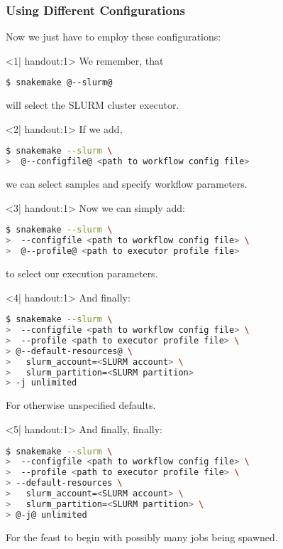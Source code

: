 \begin{frame}[fragile]
  \frametitle{Using Different Configurations}
  Now we just have to employ these configurations:\newline
  \begin{onlyenv}<1| handout:1>
    We remember, that 
    \begin{lstlisting}[language=Bash, style=Shell]
$ snakemake @--slurm@
    \end{lstlisting}
    will select the SLURM cluster executor.\vfill
  \end{onlyenv}
  \begin{onlyenv}<2| handout:1>
    If we add,
    \begin{lstlisting}[language=Bash, style=Shell]
$ snakemake --slurm \
>  @--configfile@ <path to workflow config file>
    \end{lstlisting}
    we can select samples and specify workflow parameters.\vfill
  \end{onlyenv}
  \begin{onlyenv}<3| handout:1>
   Now we can simply add:
       \begin{lstlisting}[language=Bash, style=Shell]
$ snakemake --slurm \
>  --configfile <path to workflow config file> \
>  @--profile@ <path to executor profile file> 
    \end{lstlisting}
    to select our execution parameters.\vfill
  \end{onlyenv}
  \begin{onlyenv}<4| handout:1>
   And finally:
       \begin{lstlisting}[language=Bash, style=Shell]
$ snakemake --slurm \
>  --configfile <path to workflow config file> \
>  --profile <path to executor profile file> \
> @--default-resources@ \ 
>   slurm_account=<SLURM account> \
>   slurm_partition=<SLURM partition> 
> -j unlimited
    \end{lstlisting}
    For otherwise unspecified defaults.
    \vfill
  \end{onlyenv}
  \begin{onlyenv}<5| handout:1>
   And finally, finally:
       \begin{lstlisting}[language=Bash, style=Shell]
$ snakemake --slurm \
>  --configfile <path to workflow config file> \
>  --profile <path to executor profile file> \
> --default-resources \ 
>   slurm_account=<SLURM account> \
>   slurm_partition=<SLURM partition> \
> @-j@ unlimited
    \end{lstlisting}
    For the feast to begin with possibly many jobs being spawned.
    \vfill
  \end{onlyenv}
\end{frame}


